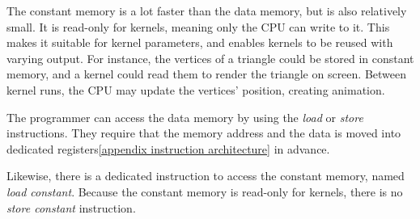 \documentclass[../main/report.tex]{subfiles}
\begin{document}
The constant memory is a lot faster than the data memory, but is also relatively small.
It is read-only for kernels, meaning only the CPU can write to it.
This makes it suitable for kernel parameters, and enables kernels to be reused with varying output.
For instance, the vertices of a triangle could be stored in constant memory,
and a kernel could read them to render the triangle on screen.
Between kernel runs, the CPU may update the vertices' position, creating animation.

The programmer can access the data memory by using the \emph{load} or \emph{store} instructions.
They require that the memory address and the data is moved into dedicated registers\ref{appendix instruction architecture} in advance.

Likewise, there is a dedicated instruction to access the constant memory, named \textit{load constant}.
Because the constant memory is read-only for kernels, there is no \textit{store constant} instruction.

\end{document}
